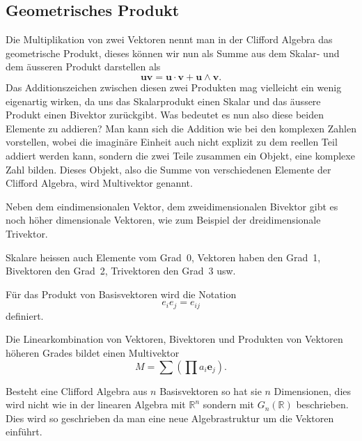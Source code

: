 \subsection{Geometrisches Produkt}
Die Multiplikation von zwei Vektoren nennt man in der Clifford Algebra das geometrische Produkt, dieses können wir nun als Summe aus dem Skalar- und dem äusseren Produkt darstellen als
\begin{equation*}
    \textbf{u}\textbf{v} = \textbf{u}\cdot \textbf{v} + \textbf{u} \wedge \textbf{v}.
\end{equation*}
Das Additionszeichen zwischen diesen zwei Produkten mag vielleicht ein wenig eigenartig wirken, da uns das Skalarprodukt einen Skalar und das äussere Produkt einen Bivektor zurückgibt. Was bedeutet es nun also diese beiden Elemente zu addieren?
Man kann sich die Addition wie bei den komplexen Zahlen vorstellen, wobei die imaginäre Einheit auch nicht explizit zu dem reellen Teil addiert werden kann, sondern die zwei Teile zusammen ein Objekt, eine komplexe Zahl bilden. 
Dieses Objekt, also die Summe von verschiedenen Elemente der Clifford Algebra, wird Multivektor genannt.
\begin{definition}
Neben dem eindimensionalen Vektor, dem zweidimensionalen Bivektor gibt es noch höher dimensionale Vektoren, wie zum Beispiel der dreidimensionale Trivektor.
\end{definition}
%
\begin{definition}
Skalare heissen auch Elemente vom Grad~0, Vektoren haben den Grad~1, Bivektoren den Grad~2, Trivektoren den Grad~3 usw.
\end{definition}
\begin{definition}
	Für das Produkt von Basisvektoren wird die Notation
	\begin{equation}
		e_ie_j = e_{i\!j}
	\end{equation}
	 definiert.
\end{definition}
\begin{definition}
	Die Linearkombination von Vektoren, Bivektoren und Produkten von Vektoren höheren Grades
  bildet einen Multivektor
	\begin{equation}
		M = \sum \left ( \prod a_i\textbf{e}_j \right ).
	\end{equation}
\end{definition}
Besteht eine Clifford Algebra aus $n$ Basisvektoren so hat sie $n$ Dimensionen, dies wird nicht wie in der linearen Algebra mit $\mathbb{R}^n$ sondern mit $G_n(\mathbb{R})$ beschrieben. Dies wird so geschrieben da man eine neue Algebrastruktur um die Vektoren einführt.
